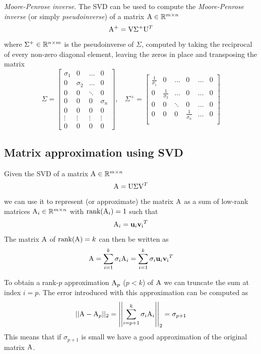 \textit{Moore-Penrose inverse}.
The SVD can be used to compute the \textit{Moore-Penrose inverse} (or simply \textit{pseudoinverse}) of a matrix $\mathrm{A} \in \mathbb{R}^{m \times n}$
$$ \mathrm{A}^{+} = \mathrm{V}\Sigma^{+}\mathrm{U}^T $$
where $\Sigma^{+} \in \mathbb{R}^{n \times m}$ is the pseudoinverse of $\Sigma$, computed by taking the reciprocal of every non-zero diagonal element, leaving the zeros in place and transposing the matrix
$$
    \Sigma =
    \begin{bmatrix}
        \sigma_1 & 0 & \hdots & 0\\
        0 & \sigma_2 & \hdots & 0\\
        0 & 0 & \ddots & 0\\
        0 & 0 & 0 & \sigma_n\\
        0 & 0 & 0 & 0\\
        \vdots & \vdots & \vdots & \vdots\\
        0 & 0 & 0 & 0
    \end{bmatrix},\ \ \ \ 
    \Sigma^{+} =
    \begin{bmatrix}
        \frac{1}{\sigma_1} & 0 & \hdots & 0 & \hdots & 0\\
        0 & \frac{1}{\sigma_2} & \hdots & 0 & \hdots & 0\\
        0 & 0 & \ddots & 0 & \hdots & 0\\
        0 & 0 & 0 & \frac{1}{\sigma_n} & \hdots & 0\\
    \end{bmatrix}
$$


\subsection{Matrix approximation using SVD}
Given the SVD of a matrix $\mathrm{A} \in \mathbb{R}^{m \times n}$
$$ \mathrm{A} = \mathrm{U}\Sigma\mathrm{V}^T $$
we can use it to represent (or approximate) the matrix $\mathrm{A}$ as a sum of low-rank matrices $\mathrm{A}_i \in \mathbb{R}^{m \times n}$ with $\text{rank}(\mathrm{A}_i) = 1$ such that
$$ \mathrm{A}_i = \mathbf{u}_i\mathrm{\mathbf{v}_i}^T $$
The matrix $ \mathrm{A}$ of $\mathrm{rank}(\mathrm{A}) = k$ can then be written as
$$ \mathrm{A} = \sum^{k}_{i = 1}{\sigma_i\mathrm{A}_i} = \sum^{k}_{i = 1}{\sigma_i\mathbf{u}_i\mathrm{\mathbf{v}_i}^T} $$

To obtain a rank-$p$ approximation $\mathrm{A}_p$ ($p < k$) of $\mathrm{A}$ we can truncate the sum at index $i = p$. The error introduced with this approximation can be computed as
$$ ||\mathrm{A} - \mathrm{A}_p||_2 = \left|\left|\sum^{k}_{i = p+1}{\sigma_i\mathrm{A}_i}\right|\right|_2 = \sigma_{p+1}$$
This means that if $\sigma_{p+1}$ is small we have a good approximation of the original matrix $\mathrm{A}$.

